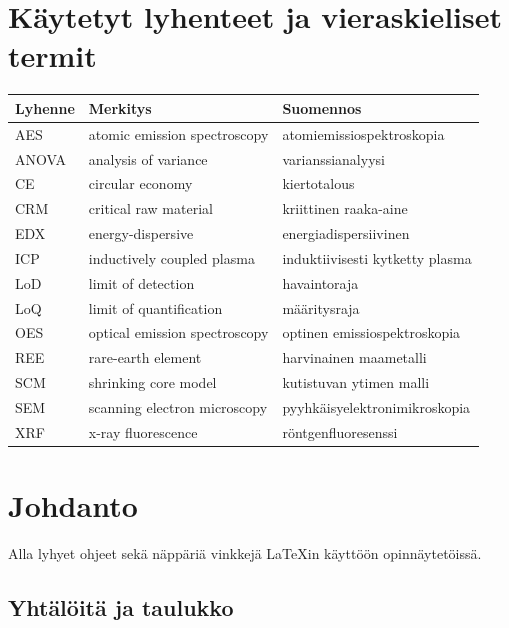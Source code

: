 \documentclass[a4paper, 12pt, finnish]{article}
\begin{document}
\section*{Käytetyt lyhenteet ja vieraskieliset termit}
\begin{table}[h!]
\begin{tabular}{lll}
\textbf{Lyhenne} & \textbf{Merkitys} & \textbf{Suomennos}\\
\hline
AES     & atomic emission spectroscopy & atomiemissiospektroskopia\\
ANOVA   & analysis of variance & varianssianalyysi\\
CE      & circular economy & kiertotalous\\
CRM     & critical raw material & kriittinen raaka-aine\\
EDX     & energy-dispersive & energiadispersiivinen\\
ICP     & inductively coupled plasma & induktiivisesti kytketty plasma\\
LoD     & limit of detection & havaintoraja\\
LoQ     & limit of quantification & määritysraja\\
OES     & optical emission spectroscopy & optinen emissiospektroskopia \\
REE     & rare-earth element & harvinainen maametalli\\
SCM     & shrinking core model & kutistuvan ytimen malli\\
SEM     & scanning electron microscopy & pyyhkäisyelektronimikroskopia\\
XRF     & x-ray fluorescence & röntgenfluoresenssi\\
\end{tabular}
\end{table}
\newpage
\thispagestyle{empty}
\tableofcontents
\cleardoublepage
{}



\newpage

\section{Johdanto}

Alla lyhyet ohjeet sekä näppäriä vinkkejä LaTeXin käyttöön opinnäytetöissä.


\subsection{Yhtälöitä ja taulukko}
\end{document}
